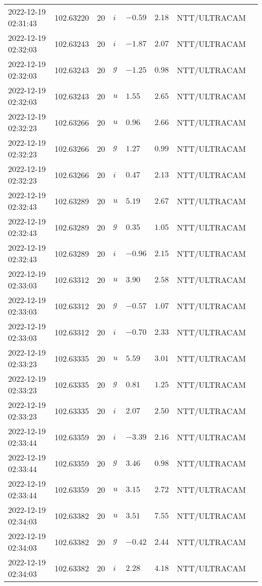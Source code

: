 \documentclass{nature_plusfigure}
\begin{document}
\begin{supplement}
\begin{center}
\begin{longtable}{llllllll}
2022-12-19 02:31:43 & 102.63220 & 20 & $i$ & $-0.59$ & $2.18$ & NTT/ULTRACAM &  \\ 
2022-12-19 02:32:03 & 102.63243 & 20 & $i$ & $-1.87$ & $2.07$ & NTT/ULTRACAM &  \\ 
2022-12-19 02:32:03 & 102.63243 & 20 & $g$ & $-1.25$ & $0.98$ & NTT/ULTRACAM &  \\ 
2022-12-19 02:32:03 & 102.63243 & 20 & $u$ & $1.55$ & $2.65$ & NTT/ULTRACAM &  \\ 
2022-12-19 02:32:23 & 102.63266 & 20 & $u$ & $0.96$ & $2.66$ & NTT/ULTRACAM &  \\ 
2022-12-19 02:32:23 & 102.63266 & 20 & $g$ & $1.27$ & $0.99$ & NTT/ULTRACAM &  \\ 
2022-12-19 02:32:23 & 102.63266 & 20 & $i$ & $0.47$ & $2.13$ & NTT/ULTRACAM &  \\ 
2022-12-19 02:32:43 & 102.63289 & 20 & $u$ & $5.19$ & $2.67$ & NTT/ULTRACAM &  \\ 
2022-12-19 02:32:43 & 102.63289 & 20 & $g$ & $0.35$ & $1.05$ & NTT/ULTRACAM &  \\ 
2022-12-19 02:32:43 & 102.63289 & 20 & $i$ & $-0.96$ & $2.15$ & NTT/ULTRACAM &  \\ 
2022-12-19 02:33:03 & 102.63312 & 20 & $u$ & $3.90$ & $2.58$ & NTT/ULTRACAM &  \\ 
2022-12-19 02:33:03 & 102.63312 & 20 & $g$ & $-0.57$ & $1.07$ & NTT/ULTRACAM &  \\ 
2022-12-19 02:33:03 & 102.63312 & 20 & $i$ & $-0.70$ & $2.33$ & NTT/ULTRACAM &  \\ 
2022-12-19 02:33:23 & 102.63335 & 20 & $u$ & $5.59$ & $3.01$ & NTT/ULTRACAM &  \\ 
2022-12-19 02:33:23 & 102.63335 & 20 & $g$ & $0.81$ & $1.25$ & NTT/ULTRACAM &  \\ 
2022-12-19 02:33:23 & 102.63335 & 20 & $i$ & $2.07$ & $2.50$ & NTT/ULTRACAM &  \\ 
2022-12-19 02:33:44 & 102.63359 & 20 & $i$ & $-3.39$ & $2.16$ & NTT/ULTRACAM &  \\ 
2022-12-19 02:33:44 & 102.63359 & 20 & $g$ & $3.46$ & $0.98$ & NTT/ULTRACAM &  \\ 
2022-12-19 02:33:44 & 102.63359 & 20 & $u$ & $3.15$ & $2.72$ & NTT/ULTRACAM &  \\ 
2022-12-19 02:34:03 & 102.63382 & 20 & $u$ & $3.51$ & $7.55$ & NTT/ULTRACAM &  \\ 
2022-12-19 02:34:03 & 102.63382 & 20 & $g$ & $-0.42$ & $2.44$ & NTT/ULTRACAM &  \\ 
2022-12-19 02:34:03 & 102.63382 & 20 & $i$ & $2.28$ & $4.18$ & NTT/ULTRACAM &  \\ 

\end{longtable}
\end{center}
\end{supplement}
\end{document}
